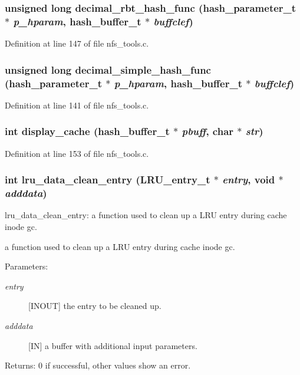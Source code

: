 \subsubsection{\setlength{\rightskip}{0pt plus 5cm}unsigned long decimal\_\-rbt\_\-hash\_\-func (hash\_\-parameter\_\-t $\ast$ {\em p\_\-hparam}, hash\_\-buffer\_\-t $\ast$ {\em buffclef})}\label{nfs__tools_8c_a1}




Definition at line 147 of file nfs\_\-tools.c.
\subsubsection{\setlength{\rightskip}{0pt plus 5cm}unsigned long decimal\_\-simple\_\-hash\_\-func (hash\_\-parameter\_\-t $\ast$ {\em p\_\-hparam}, hash\_\-buffer\_\-t $\ast$ {\em buffclef})}\label{nfs__tools_8c_a0}




Definition at line 141 of file nfs\_\-tools.c.
\subsubsection{\setlength{\rightskip}{0pt plus 5cm}int display\_\-cache (hash\_\-buffer\_\-t $\ast$ {\em pbuff}, char $\ast$ {\em str})}\label{nfs__tools_8c_a2}




Definition at line 153 of file nfs\_\-tools.c.
\subsubsection{\setlength{\rightskip}{0pt plus 5cm}int lru\_\-data\_\-clean\_\-entry (LRU\_\-entry\_\-t $\ast$ {\em entry}, void $\ast$ {\em adddata})}\label{nfs__tools_8c_a9}


lru\_\-data\_\-clean\_\-entry: a function used to clean up a LRU entry during cache inode gc.

a function used to clean up a LRU entry during cache inode gc.

\begin{Desc}
\item[Parameters:]
\begin{description}
\item[{\em entry}][INOUT] the entry to be cleaned up. \item[{\em adddata}][IN] a buffer with additional input parameters.\end{description}
\end{Desc}
\begin{Desc}
\item[Returns:]0 if successful, other values show an error. \end{Desc}


